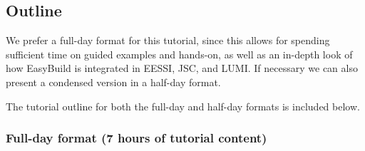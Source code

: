\subsection*{Outline}


We prefer a full-day format for this tutorial, since this allows for spending sufficient time
on guided examples and hands-on, as well as an in-depth look of how EasyBuild is integrated in
EESSI, JSC, and LUMI. If necessary we can also present a condensed version in a half-day format.

The tutorial outline for both the full-day and half-day formats is included below.

\subsubsection*{Full-day format (7 hours of tutorial content)}

